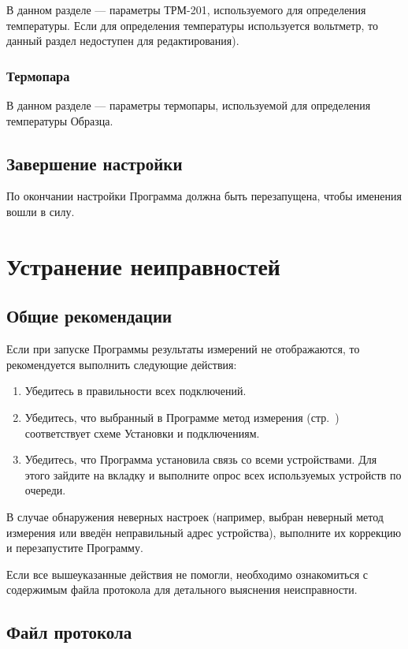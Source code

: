 \documentclass[12pt, a4paper, twocolumn]{report}
\begin{document}
В данном разделе --- параметры ТРМ-201, используемого для определения температуры. Если для определения температуры используется вольтметр, то данный раздел недоступен для редактирования).



\subsection{Термопара}

В данном разделе --- параметры термопары, используемой для определения температуры Образца.



\section{Завершение настройки}

По окончании настройки Программа должна быть перезапущена, чтобы именения вошли в силу.

\chapter{Устранение неиправностей}

\section{Общие рекомендации}

Если при запуске Программы результаты измерений не отображаются, то рекомендуется выполнить следующие действия:

\begin{enumerate}
\item Убедитесь в правильности всех подключений.
\item Убедитесь, что выбранный в Программе метод измерения (стр.~\pageref{sec_r_measure_config}) соответствует схеме Установки и подключениям.
\item Убедитесь, что Программа установила связь со всеми устройствами. Для этого зайдите на вкладку  и выполните опрос всех используемых устройств по очереди.
\end{enumerate}

В случае обнаружения неверных настроек (например, выбран неверный метод измерения или введён неправильный адрес устройства), выполните их коррекцию и перезапустите Программу.

Если все вышеуказанные действия не помогли, необходимо ознакомиться с содержимым файла протокола для детального выяснения неисправности.

\section{Файл протокола}


\end{document}
